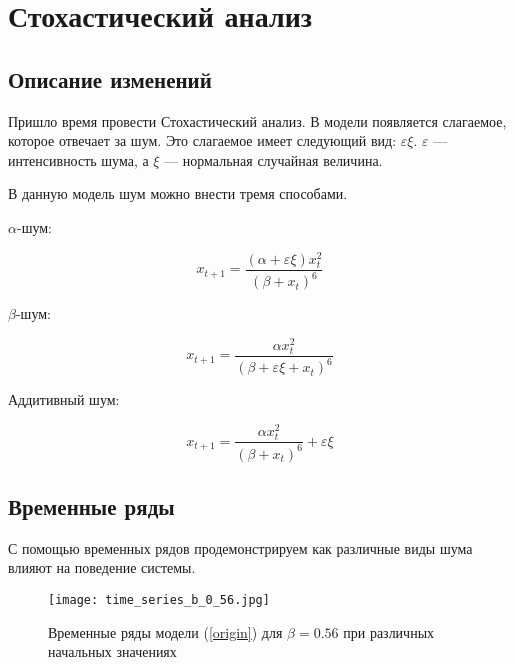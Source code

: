 \section{Стохастический анализ}

    \subsection{Описание изменений}

        Пришло время провести Стохастический анализ. В модели появляется слагаемое, которое отвечает за шум. Это слагаемое имеет следующий вид: \(\varepsilon \xi\). \(\varepsilon\) --- интенсивность шума, а \(\xi\) --- нормальная случайная величина.

        В данную модель шум можно внести тремя способами.

        \(\alpha\)-шум: 

        \[
            x_{t + 1} = \frac{(\alpha + \varepsilon \xi) x_t^2}{(\beta + x_t)^6}
        \]

        \(\beta\)-шум:

        \[
            x_{t + 1} = \frac{\alpha x_t^2}{(\beta + \varepsilon \xi + x_t)^6}
        \]

        Аддитивный шум:

        \[
            x_{t + 1} = \frac{\alpha x_t^2}{(\beta + x_t)^6} + \varepsilon \xi
        \]

    \subsection{Временные ряды}

        С помощью временных рядов продемонстрируем как различные виды шума влияют на поведение системы.

        \begin{figure}
            \centering
            \texttt{[image: time\_series\_b\_0\_56.jpg]}

            \captionsetup{justification=centering}
            \caption{Временные ряды модели (\ref{origin}) для \(\beta = 0.56\) при различных начальных значениях}
            \label{time_series_b_0_56}
        \end{figure}
